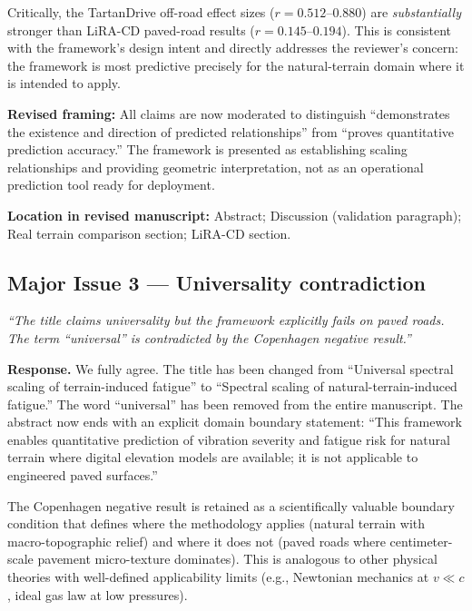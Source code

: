 \documentclass[11pt]{article}
\newcommand{\revquote}[1]{\medskip\noindent\textit{``#1''}\medskip}
\newcommand{\revloc}[1]{\noindent\textbf{Location in revised manuscript:} #1\medskip}
\begin{document}
\noindent Critically, the TartanDrive off-road effect sizes ($r = 0.512$--$0.880$) are \emph{substantially} stronger than LiRA-CD paved-road results ($r = 0.145$--$0.194$). This is consistent with the framework's design intent and directly addresses the reviewer's concern: the framework is most predictive precisely for the natural-terrain domain where it is intended to apply.

\textbf{Revised framing:} All claims are now moderated to distinguish ``demonstrates the existence and direction of predicted relationships'' from ``proves quantitative prediction accuracy.'' The framework is presented as establishing scaling relationships and providing geometric interpretation, not as an operational prediction tool ready for deployment.

\revloc{Abstract; Discussion (validation paragraph); Real terrain comparison section; LiRA-CD section.}

\bigskip

\subsection*{Major Issue 3 --- Universality contradiction}

\revquote{The title claims universality but the framework explicitly fails on paved roads. The term ``universal'' is contradicted by the Copenhagen negative result.}

\noindent\textbf{Response.} We fully agree. The title has been changed from ``Universal spectral scaling of terrain-induced fatigue'' to ``Spectral scaling of natural-terrain-induced fatigue.'' The word ``universal'' has been removed from the entire manuscript. The abstract now ends with an explicit domain boundary statement: ``This framework enables quantitative prediction of vibration severity and fatigue risk for natural terrain where digital elevation models are available; it is not applicable to engineered paved surfaces.''

The Copenhagen negative result is retained as a scientifically valuable boundary condition that defines where the methodology applies (natural terrain with macro-topographic relief) and where it does not (paved roads where centimeter-scale pavement micro-texture dominates). This is analogous to other physical theories with well-defined applicability limits (e.g., Newtonian mechanics at $v \ll c$, ideal gas law at low pressures).
\end{document}
